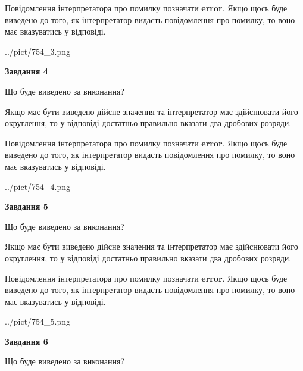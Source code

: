\documentclass[12pt, ukrainian]{article}
\begin{document}
{\begin {Large}
Повідомлення інтерпретатора про помилку позначати \textbf{error}.
Якщо щось буде виведено до того, як інтерпретатор видасть повідомлення про помилку, 
то воно має вказуватись у відповіді. \par

\begin{center}
	{../pict/754_3.png}
\end{center}
\newpage

{\begin {center}\textbf{Завдання 4}\end {center}}\par
Що буде виведено за виконання? \par

Якщо має бути виведено дійсне значення та інтерпретатор має здійснювати його округлення, 
то у відповіді достатньо правильно вказати два дробових розряди.

Повідомлення інтерпретатора про помилку позначати \textbf{error}.
Якщо щось буде виведено до того, як інтерпретатор видасть повідомлення про помилку, 
то воно має вказуватись у відповіді. \par

\begin{center}
	{../pict/754_4.png}
\end{center}
\newpage

{\begin {center}\textbf{Завдання 5}\end {center}}\par
Що буде виведено за виконання? \par

Якщо має бути виведено дійсне значення та інтерпретатор має здійснювати його округлення, 
то у відповіді достатньо правильно вказати два дробових розряди.

Повідомлення інтерпретатора про помилку позначати \textbf{error}.
Якщо щось буде виведено до того, як інтерпретатор видасть повідомлення про помилку, 
то воно має вказуватись у відповіді. \par

\begin{center}
	{../pict/754_5.png}
\end{center}
\newpage

{\begin {center}\textbf{Завдання 6}\end {center}}\par
Що буде виведено за виконання? \par


\end{Large}}
\end{document}
